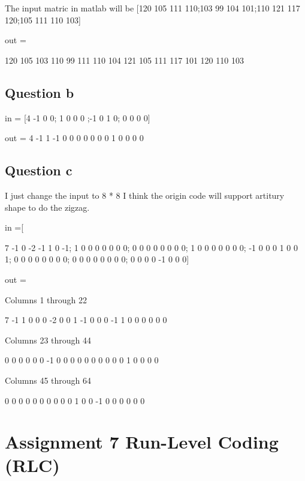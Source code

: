\documentclass[titlepage]{article}
\begin{document}
The input matric in matlab will be [120 105 111 110;103 99 104 101;110 121 117 120;105 111 110 103]

out =

120   105   103   110    99   111   110   104   121   105   111   117   101   120   110   103

\subsection{Question b}
\label{sec:orgcd88d1b}

in = [4    -1     0     0; 1     0     0     0  ;-1    0     1     0; 0     0     0     0]

out = 4	-1	1	-1	0	0	0	0	0	0	0	1	0	0	0	0


\subsection{Question c}
\label{sec:orga21da1e}

I just change the input to 8 * 8 I think the origin code will support artitury shape to do the zigzag.

in =[

 7    -1     0    -2    -1     1     0    -1;
 1     0     0     0     0     0     0     0;
 0     0     0     0     0     0     0     0;
 1     0     0     0     0     0     0     0;
-1     0     0     0     1     0     0     1;
 0     0     0     0     0     0     0     0;
 0     0     0     0     0     0     0     0;
 0     0     0     0    -1     0     0     0]

out =

Columns 1 through 22

7    -1     1     0     0     0    -2     0     0     1    -1     0     0     0    -1     1     0     0     0     0     0     0

Columns 23 through 44

0     0     0     0     0     0    -1     0     0     0     0     0     0     0     0     0     0     1     0     0     0     0

Columns 45 through 64

0     0     0     0     0     0     0     0     0     0     1     0     0    -1     0     0     0     0     0     0


\section{Assignment 7 Run-Level Coding (RLC)}
\label{sec:org316de68}
\end{document}

